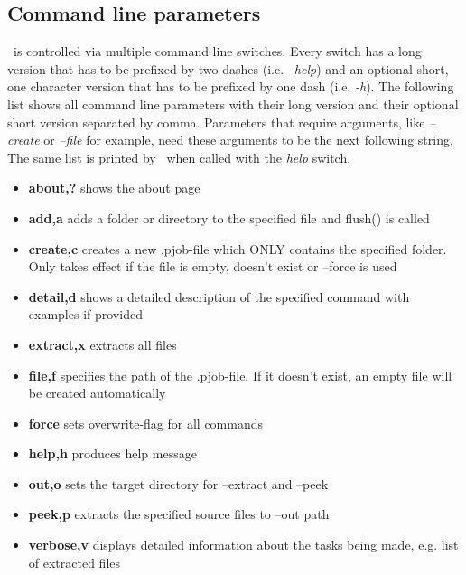 \subsection{Command line parameters}
\PJOBCMD\ is controlled via multiple command line switches.
Every switch has a long version that has to be prefixed by two dashes (i.e. \textit{--help})
and an optional short, one character version that has to be prefixed by one dash (i.e. \textit{-h}).
The following list shows all command line parameters with their long version and their optional short version
separated by comma.
Parameters that require arguments, like \textit{--create} or \textit{--file} for example,
need these arguments to be the next following string.
The same list is printed by \PJOBCMD\ when called with the \textit{help} switch.
\begin{itemize}
	\item \textbf{about,?} shows the about page
	\item \textbf{add,a} adds a folder or directory to the specified file and flush() is called
	\item \textbf{create,c} creates a new .pjob-file which ONLY contains the specified folder. Only takes effect if the file is empty,
							doesn't exist or --force is used
	\item \textbf{detail,d} shows a detailed description of the specified command with examples if provided
	\item \textbf{extract,x} extracts all files
	\item \textbf{file,f} specifies the path of the .pjob-file. If it doesn't exist, an empty file will be created automatically					
	\item \textbf{force} sets overwrite-flag for all commands
	\item \textbf{help,h} produces help message
	\item \textbf{out,o} sets the target directory for --extract and --peek
	\item \textbf{peek,p} extracts the specified source files to --out path
	\item \textbf{verbose,v} displays detailed information about the tasks being made, e.g. list of extracted files
\end{itemize}
